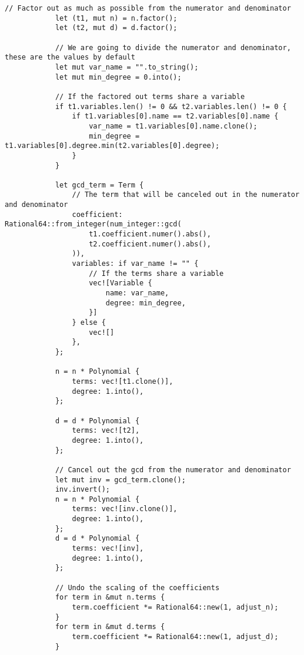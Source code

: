 \begin{lstlisting}[caption={The implementation of the \texttt{simplify()} method for the \texttt{PolyRatio} struct}, label={lst:polyratio-simplify}]
            // Factor out as much as possible from the numerator and denominator
            let (t1, mut n) = n.factor();
            let (t2, mut d) = d.factor();
    
            // We are going to divide the numerator and denominator, these are the values by default
            let mut var_name = "".to_string();
            let mut min_degree = 0.into();
    
            // If the factored out terms share a variable
            if t1.variables.len() != 0 && t2.variables.len() != 0 {
                if t1.variables[0].name == t2.variables[0].name {
                    var_name = t1.variables[0].name.clone();
                    min_degree = t1.variables[0].degree.min(t2.variables[0].degree);
                }
            }
    
            let gcd_term = Term {
                // The term that will be canceled out in the numerator and denominator
                coefficient: Rational64::from_integer(num_integer::gcd(
                    t1.coefficient.numer().abs(),
                    t2.coefficient.numer().abs(),
                )),
                variables: if var_name != "" {
                    // If the terms share a variable
                    vec![Variable {
                        name: var_name,
                        degree: min_degree,
                    }]
                } else {
                    vec![]
                },
            };

            n = n * Polynomial {
                terms: vec![t1.clone()],
                degree: 1.into(),
            };

            d = d * Polynomial {
                terms: vec![t2],
                degree: 1.into(),
            };
    
            // Cancel out the gcd from the numerator and denominator
            let mut inv = gcd_term.clone();
            inv.invert();
            n = n * Polynomial {
                terms: vec![inv.clone()],
                degree: 1.into(),
            };
            d = d * Polynomial {
                terms: vec![inv],
                degree: 1.into(),
            };
    
            // Undo the scaling of the coefficients
            for term in &mut n.terms {
                term.coefficient *= Rational64::new(1, adjust_n);
            }
            for term in &mut d.terms {
                term.coefficient *= Rational64::new(1, adjust_d);
            }
    

\end{lstlisting}

